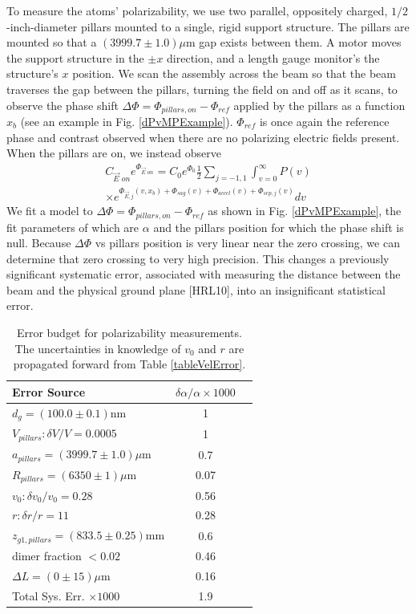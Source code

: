 \documentclass[twocolumn, prl,showpacs,superscriptaddress]{revtex4-1}   %
\newcommand{\figref}[1]{Fig. \ref{#1}}
\newcommand{\sigv}{0.28}
\newcommand{\sigr}{11}
\begin{document}
To measure the atoms' polarizability, we use two parallel, oppositely charged, $1/2$-inch-diameter pillars mounted to a single, rigid support structure. The pillars are mounted so that a $(3999.7 \pm 1.0)\mu$m gap exists between them. A motor moves the support structure in the $\pm x$ direction, and a length gauge monitor's the structure's $x$ position. We scan the assembly across the beam so that the beam traverses the gap between the pillars, turning the field on and off as it scans, to observe the phase shift $\Delta\Phi = \Phi_{pillars,on} - \Phi_{ref}$ applied by the pillars as a function $x_b$ (see an example in \figref{dPvMPExample}). $\Phi_{ref}$ is once again the reference phase and contrast observed when there are no polarizing electric fields present.
When the pillars are on, we instead observe
\begin{align}
	C_{\vec{E}\textit{ on}}e^{\Phi_{\vec{E}\textit{ on}}} = 
		C_0e^{\Phi_0}		
		\frac{1}{2} \sum_{j=-1,1}
		\int_{v=0}^{\infty} P(v) \nonumber \\ \times
		e^{
			\Phi_{\vec{E},j}(v,x_b) + 
			\Phi_{sag}(v) + \Phi_{accel}(v) + \Phi_{sep,j}(v)
		} 
		dv
	\label{CPPolesEOn}
\end{align}
We fit a model to $\Delta\Phi = \Phi_{pillars,on} - \Phi_{ref}$ as shown in \figref{dPvMPExample}, the fit parameters of which are $\alpha$ and the pillars position for which the phase shift is null. Because $\Delta\Phi$ vs pillars position is very linear near the zero crossing, we can determine that zero crossing to very high precision. 
This changes a previously significant systematic error, associated with measuring the distance between the beam and the physical ground plane [HRL10], into an insignificant statistical error.

\begingroup
\begin{table}
\caption{\label{tablePolError}Error budget for polarizability measurements. The uncertainties in knowledge of $v_0$ and $r$ are propagated forward from Table \ref{tableVelError}.}
\begin{center}
\begin{tabular}{l c c}
\hline\hline
Error Source & $\delta\alpha/\alpha \times 1000$ \\
\hline
$d_g = (100.0 \pm 0.1) \mathrm{nm}$ 		& 1 \\
$V_{pillars}: \delta V/V = 0.0005$ 		& 1 \\
$a_{pillars} = (3999.7 \pm 1.0) \mu\mathrm{m}$ 		& 0.7 \\
$R_{pillars} = (6350 \pm 1) \mu\mathrm{m}$ 		& 0.07 \\
$v_0: \delta v_0/v_0 = \sigv$		& 0.56 \\
$r: \delta r/r = \sigr$ 		& 0.28 \\
$z_{g1,pillars} = (833.5 \pm 0.25) \mathrm{mm}$ 		& 0.6 \\
dimer fraction $ < 0.02$ 		& 0.46 \\
$\Delta L = (0 \pm 15) \mu\mathrm{m}$ 		& 0.16 \\
\hline
Total Sys. Err. $\times 1000$ & 1.9 \\
\hline\hline
\end{tabular}
\end{center}
\end{table}
\endgroup
\end{document}

